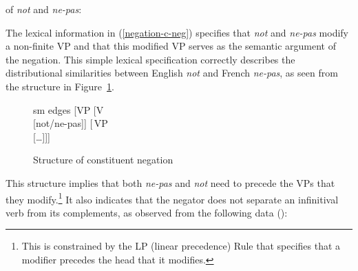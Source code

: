 \documentclass[output=paper
	        ,collection
	        ,collectionchapter
 	        ,biblatex
                ,babelshorthands
                ,newtxmath
                ,draftmode
                ,colorlinks, citecolor=brown
]{langscibook}
\begin{document}
{\begin{exe}
\begin{xlist}
\begin{exe}
\begin{xlist}
%

\ea
\label{negation-c-neg}
\localvs of \emph{not} and \emph{ne-pas}:\\
\z


\noindent %
The lexical information in (\ref{negation-c-neg}) specifies that
\textit{not} and \textit{ne-pas} modify a non-finite VP and that this
modified VP serves as the semantic argument of the negation.
This simple lexical specification correctly describes the
distributional similarities between English \textit{not} and French
\textit{ne-pas}, as seen from the structure in Figure~\ref{negation-not-vp-mod}.

\begin{figure}
	\begin{forest}
		sm edges
		[VP
			[V\\
					[not/ne-pas]]
			[\,VP\\
					[\ldots]]]
	\end{forest}
\caption{Structure of constituent negation}\label{negation-not-vp-mod}
\end{figure}
\noindent
This structure implies that
both \textit{ne-pas} and \textit{not} need to precede the VPs that they modify.\footnote{
This is constrained by the LP (linear precedence) Rule that specifies
that a modifier precedes the head that it modifies.}  It also
indicates that the negator does not separate an infinitival verb
from its complements, as observed from the following data (\citealp[]{KS:02}):


\end{xlist}
\end{exe}
\end{xlist}
\end{exe}}
\end{document}
